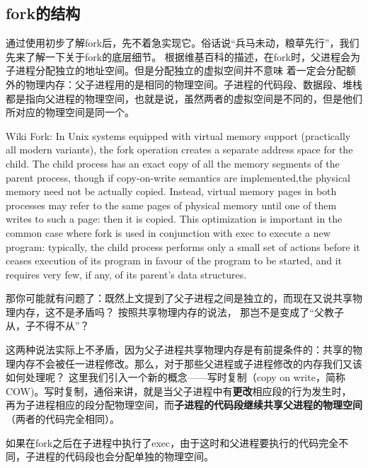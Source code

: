 
\subsection{fork的结构}

通过使用初步了解fork后，先不着急实现它。俗话说“兵马未动，粮草先行”，我们先来了解一下关于fork的底层细节。
根据维基百科的描述，在fork时，父进程会为子进程分配独立的地址空间。但是分配独立的虚拟空间并不意味
着一定会分配额外的物理内存：父子进程用的是相同的物理空间。子进程的代码段、数据段、堆栈
都是指向父进程的物理空间，也就是说，虽然两者的虚拟空间是不同的，但是他们所对应的物理空间是同一个。

\begin{note}
\small{
Wiki Fork: In Unix systems equipped with virtual memory support (practically all modern variants), the fork operation creates a separate address space
 for the child. The child process has an exact copy of all the memory segments of the parent process, though if copy-on-write semantics 
 are implemented,the physical memory need not be actually copied. Instead, virtual memory pages in both processes may refer to the same pages of physical memory 
 until one of them writes to such a page: then it is copied. This optimization is important in the common case where fork is used 
 in conjunction with exec to execute a new program: typically, the child process performs only a small set of actions before it ceases
 execution of its program in favour of the program to be started, and it requires very few, if any, of its parent's data structures.}
\end{note}

那你可能就有问题了：既然上文提到了父子进程之间是独立的，而现在又说共享物理内存，这不是矛盾吗？
按照共享物理内存的说法， 那岂不是变成了“父教子从，子不得不从”？

这两种说法实际上不矛盾，因为父子进程共享物理内存是有前提条件的：共享的物理内存不会被任一进程修改。那么，对于那些父进程或子进程修改的内存我们又该如何处理呢？
这里我们引入一个新的概念——写时复制（copy on write，简称COW)。写时复制，通俗来讲，就是当父子进程中有\textbf{更改}相应段的行为发生时，
再为子进程相应的段分配物理空间，而\textbf{子进程的代码段继续共享父进程的物理空间}（两者的代码完全相同）。

\begin{note}
如果在fork之后在子进程中执行了exec，由于这时和父进程要执行的代码完全不同，子进程的代码段也会分配单独的物理空间。
\end{note}

